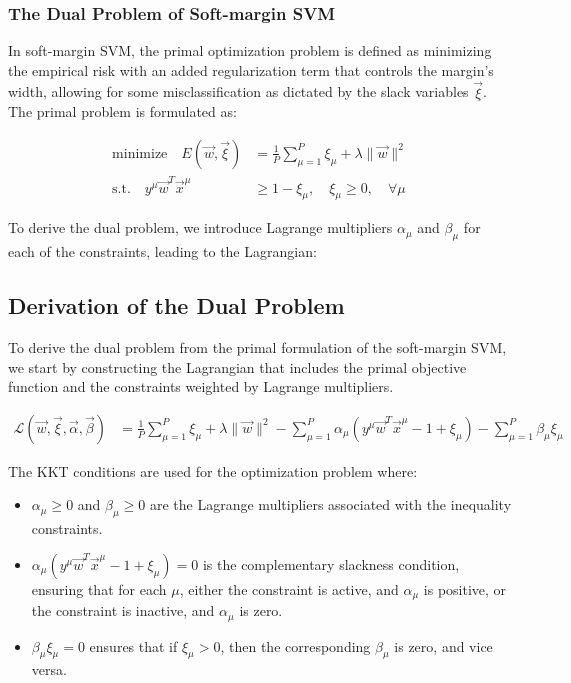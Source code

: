 \documentclass[11pt]{book} %
\begin{document}
\subsubsection{The Dual Problem of Soft-margin SVM}

In soft-margin SVM, the primal optimization problem is defined as minimizing the empirical risk with an added regularization term that controls the margin's width, allowing for some misclassification as dictated by the slack variables $\vec{\xi}$. The primal problem is formulated as:

\begin{align*}
    \text{minimize} \quad E(\vec{w}, \vec{\xi}) &= \frac{1}{P} \sum_{\mu=1}^P \xi_{\mu} + \lambda \lVert \vec{w} \rVert^2 \\
    \text{s.t.} \quad y^{\mu} \vec{w}^T \vec{x}^{\mu} &\geq 1 - \xi_{\mu}, \quad \xi_{\mu} \geq 0, \quad \forall \mu
\end{align*}

To derive the dual problem, we introduce Lagrange multipliers $\alpha_{\mu}$ and $\beta_{\mu}$ for each of the constraints, leading to the Lagrangian:

\subsection{Derivation of the Dual Problem}

To derive the dual problem from the primal formulation of the soft-margin SVM, we start by constructing the Lagrangian that includes the primal objective function and the constraints weighted by Lagrange multipliers.

\begin{align*}
    \mathcal{L}(\vec{w}, \vec{\xi}, \vec{\alpha}, \vec{\beta}) &= \frac{1}{P} \sum_{\mu=1}^P \xi_{\mu} + \lambda \lVert \vec{w} \rVert^2 - \sum_{\mu=1}^P \alpha_{\mu} (y^{\mu} \vec{w}^T \vec{x}^{\mu} - 1 + \xi_{\mu}) - \sum_{\mu=1}^P \beta_{\mu} \xi_{\mu}
\end{align*}

The KKT conditions are used for the optimization problem where:

\begin{itemize}
    \item $\alpha_{\mu} \geq 0$ and $\beta_{\mu} \geq 0$ are the Lagrange multipliers associated with the inequality constraints.
    \item $\alpha_{\mu} (y^{\mu} \vec{w}^T \vec{x}^{\mu} - 1 + \xi_{\mu}) = 0$ is the complementary slackness condition, ensuring that for each $\mu$, either the constraint is active, and $\alpha_{\mu}$ is positive, or the constraint is inactive, and $\alpha_{\mu}$ is zero.
    \item $\beta_{\mu} \xi_{\mu} = 0$ ensures that if $\xi_{\mu} > 0$, then the corresponding $\beta_{\mu}$ is zero, and vice versa.
\end{itemize}
\end{document}
